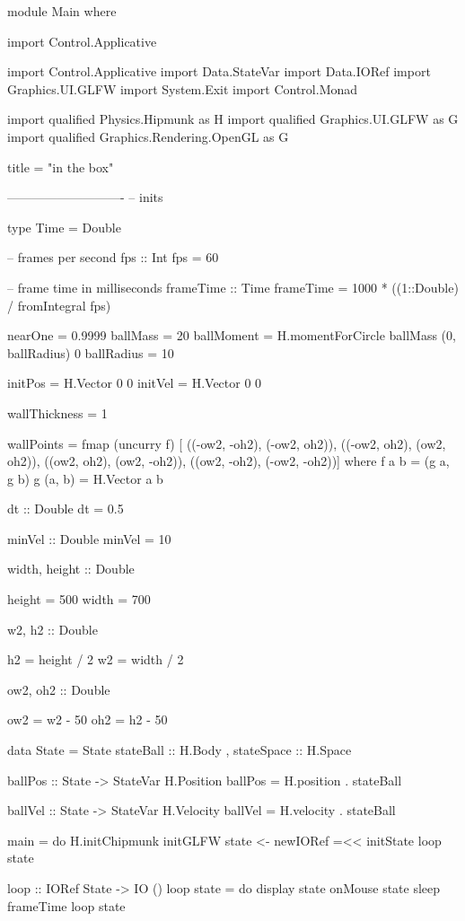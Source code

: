 \begin{code}
module Main where

import Control.Applicative

import Control.Applicative
import Data.StateVar
import Data.IORef
import Graphics.UI.GLFW
import System.Exit
import Control.Monad

import qualified Physics.Hipmunk  as H
import qualified Graphics.UI.GLFW as G
import qualified Graphics.Rendering.OpenGL as G
  
title = "in the box"

----------------------------
-- inits

type Time = Double

-- frames per second
fps :: Int
fps = 60

-- frame time in milliseconds
frameTime :: Time
frameTime = 1000 * ((1::Double) / fromIntegral fps)


nearOne = 0.9999
ballMass = 20
ballMoment = H.momentForCircle ballMass (0, ballRadius) 0
ballRadius = 10
    
initPos = H.Vector 0 0
initVel = H.Vector 0 0

wallThickness = 1

wallPoints = fmap (uncurry f) [
    ((-ow2, -oh2), (-ow2, oh2)),
    ((-ow2, oh2),  (ow2, oh2)),
    ((ow2, oh2),  (ow2, -oh2)),
    ((ow2, -oh2),   (-ow2, -oh2))]
    where f a b = (g a, g b) 
          g (a, b) = H.Vector a b  

dt :: Double
dt = 0.5

minVel :: Double
minVel = 10

width, height :: Double

height = 500
width = 700

w2, h2 :: Double

h2 = height / 2
w2 = width / 2

ow2, oh2 :: Double
    
ow2 = w2 - 50 
oh2 = h2 - 50  

data State = State 
    { stateBall     :: H.Body
    , stateSpace    :: H.Space
    }

ballPos :: State -> StateVar H.Position
ballPos = H.position . stateBall

ballVel :: State -> StateVar H.Velocity
ballVel = H.velocity . stateBall


main = do
    H.initChipmunk
    initGLFW
    state <- newIORef =<< initState
    loop state

loop :: IORef State -> IO ()
loop state = do    
    display state
    onMouse state
    sleep frameTime
    loop state


\end{code}
